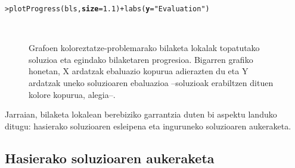 \documentclass[eu]{ifirak}\usepackage[]{graphicx}\usepackage[]{color}
\makeatletter
\newcommand{\hlnum}[1]{\textcolor[rgb]{0.659,0.4,0.051}{#1}}%
\newcommand{\hlstr}[1]{\textcolor[rgb]{0.659,0.4,0.051}{#1}}%
\newcommand{\hlopt}[1]{\textcolor[rgb]{0,0,0}{#1}}%
\newcommand{\hlstd}[1]{\textcolor[rgb]{0,0,0}{#1}}%
\newcommand{\hlkwc}[1]{\textcolor[rgb]{0.659,0.573,0.133}{\textbf{#1}}}%
\newcommand{\hlkwd}[1]{\textcolor[rgb]{0.659,0.133,0.482}{#1}}%
\newenvironment{kframe}{%
 \def\at@end@of@kframe{}%
 \ifinner\ifhmode%
  \def\at@end@of@kframe{\end{minipage}}%
  \begin{minipage}{\columnwidth}%
 \fi\fi%
 \def\FrameCommand##1{\hskip\@totalleftmargin \hskip-\fboxsep
 \colorbox{shadecolor}{##1}\hskip-\fboxsep
     \hskip-\linewidth \hskip-\@totalleftmargin \hskip\columnwidth}%
 \MakeFramed {\advance\hsize-\width
   \@totalleftmargin\z@ \linewidth\hsize
   \@setminipage}}%
 {\par\unskip\endMakeFramed%
 \at@end@of@kframe}
\newenvironment{knitrout}{}{} %
\makeatother
\begin{document}
\begin{knitrout}
\color{fgcolor}\begin{kframe}
\begin{alltt}
\hlstd{> }\hlkwd{plotProgress}\hlstd{(bls,} \hlkwc{size}\hlstd{=}\hlnum{1.1}\hlstd{)} \hlopt{+} \hlkwd{labs}\hlstd{(}\hlkwc{y}\hlstd{=}\hlstr{"Evaluation"}\hlstd{)}
\end{alltt}
\end{kframe}
\end{knitrout}

\begin{figure}[t]
\qquad
{}\\
\caption{Grafoen koloreztatze-problemarako bilaketa lokalak topatutako soluzioa eta egindako bilaketaren progresioa. Bigarren grafiko honetan, X ardatzak ebaluazio kopurua adierazten du eta Y ardatzak uneko soluzioaren ebaluazioa --soluzioak erabiltzen dituen kolore kopurua, alegia--.}\label{fig:bls_gcp}
\end{figure}

Jarraian, bilaketa lokalean berebiziko garrantzia duten bi aspektu landuko ditugu: hasierako soluzioaren esleipena eta inguruneko soluzioaren aukeraketa.

\subsection{Hasierako soluzioaren aukeraketa}
\end{document}
